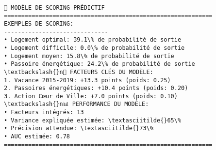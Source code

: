 \documentclass[11pt]{article}
\makeatletter
\newcommand{\boxspacing}{\kern\kvtcb@left@rule\kern\kvtcb@boxsep}
\newcommand{\prompt}[4]{
        {\ttfamily\llap{{\color{#2}[#3]:\hspace{3pt}#4}}\vspace{-\baselineskip}}
    }
\makeatother
\begin{document}
    \begin{center}
    \end{center}
    { \hspace*{\fill} \\}
    
    \begin{Verbatim}[commandchars=\\\{\}]
🎯 MODÈLE DE SCORING PRÉDICTIF
============================================================
EXEMPLES DE SCORING:
------------------------------
• Logement optimal: 39.1\% de probabilité de sortie
• Logement difficile: 0.0\% de probabilité de sortie
• Logement moyen: 15.8\% de probabilité de sortie
• Passoire énergétique: 24.2\% de probabilité de sortie
\textbackslash{}n🔑 FACTEURS CLÉS DU MODÈLE:
1. Vacance 2015-2019: +13.3 points (poids: 0.25)
2. Passoires énergétiques: +10.4 points (poids: 0.20)
3. Action Cœur de Ville: +7.0 points (poids: 0.10)
\textbackslash{}n📊 PERFORMANCE DU MODÈLE:
• Facteurs intégrés: 13
• Variance expliquée estimée: \textasciitilde{}65\%
• Précision attendue: \textasciitilde{}73\%
• AUC estimée: 0.78
============================================================
    \end{Verbatim}

    \begin{tcolorbox}[breakable, size=fbox, boxrule=1pt, pad at break*=1mm,colback=cellbackground, colframe=cellborder]
\prompt{In}{incolor}{ }{\boxspacing}
\begin{Verbatim}[commandchars=\\\{\}]

\end{Verbatim}
\end{tcolorbox}

    \begin{tcolorbox}[breakable, size=fbox, boxrule=1pt, pad at break*=1mm,colback=cellbackground, colframe=cellborder]
\prompt{In}{incolor}{ }{\boxspacing}
\begin{Verbatim}[commandchars=\\\{\}]

\end{Verbatim}
\end{tcolorbox}

    

    \begin{tcolorbox}[breakable, size=fbox, boxrule=1pt, pad at break*=1mm,colback=cellbackground, colframe=cellborder]
\prompt{In}{incolor}{ }{\boxspacing}
\begin{Verbatim}[commandchars=\\\{\}]

\end{Verbatim}
\end{tcolorbox}
\end{document}
